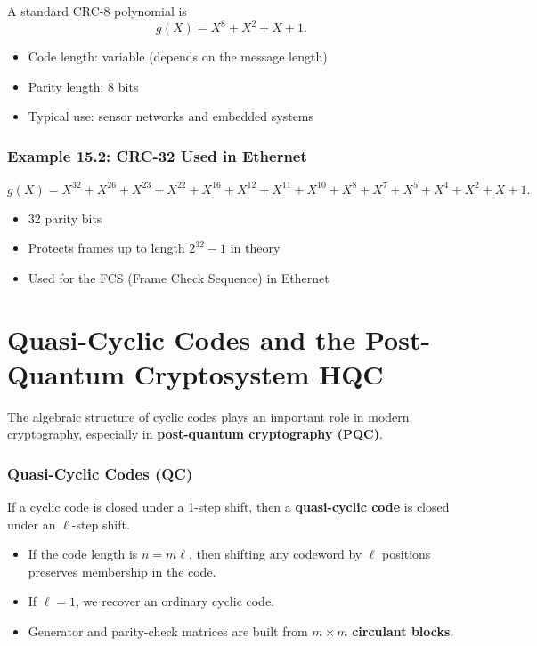 \documentclass[11pt,oneside]{book}
\providecommand{\tightlist}{\setlength{\itemsep}{0pt}\setlength{\parskip}{0pt}}
\theoremstyle{plain}
\theoremstyle{definition}
\theoremstyle{remark}
\begin{document}
A standard CRC-8 polynomial is \[g(X)=X^8+X^2+X+1.\]

\begin{itemize}
\tightlist
\item
  Code length: variable (depends on the message length)
\item
  Parity length: 8 bits
\item
  Typical use: sensor networks and embedded systems
\end{itemize}

\subsubsection{Example 15.2: CRC-32 Used in
Ethernet}\label{example-15.2-crc-32-used-in-ethernet}

\[g(X)=X^{32} + X^{26} + X^{23} + X^{22} + X^{16} + X^{12} + X^{11} + X^{10} + X^8 + X^7 + X^5 + X^4 + X^2 + X + 1.\]

\begin{itemize}
\tightlist
\item
  32 parity bits
\item
  Protects frames up to length \(2^{32}-1\) in theory
\item
  Used for the FCS (Frame Check Sequence) in Ethernet
\end{itemize}


\section{Quasi-Cyclic Codes and the Post-Quantum Cryptosystem HQC}\label{sec:qc-and-hqc}

The algebraic structure of cyclic codes plays an important role in
modern cryptography, especially in \textbf{post-quantum cryptography
(PQC)}.

\subsubsection{Quasi-Cyclic Codes (QC)}\label{quasi-cyclic-codes-qc}

If a cyclic code is closed under a 1-step shift, then a
\textbf{quasi-cyclic code} is closed under an \(\ell\)-step shift.

\begin{itemize}
\tightlist
\item
  If the code length is \(n=m\ell\), then shifting any codeword by
  \(\ell\) positions preserves membership in the code.
\item
  If \(\ell=1\), we recover an ordinary cyclic code.
\item
  Generator and parity-check matrices are built from \(m \times m\)
  \textbf{circulant blocks}.
\end{itemize}
\end{document}
